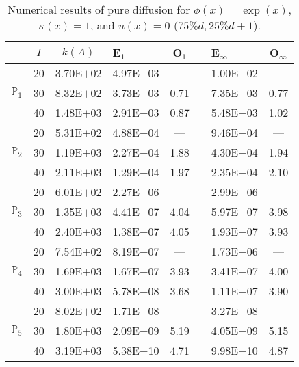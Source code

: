 \begin{table}[H]
\centering
\caption{Numerical results of pure diffusion for $\phi(x)=\exp(x)$, $\kappa(x)=1$, and $u(x)=0$ ($75\%d,25\%d+1$).}
\begin{tabular}{@{}l c c l c c l c@{}}
\toprule
 & $I$ & $k(A)$ & E$_1$ & O$_1$ && E$_{\infty}$ & O$_{\infty}$\\
\midrule
\multirow{3}{*}{$\mathbb{P}_{1}$}
 & 20 & 3.70E$+$02 & 4.97E$-$03 & --- && 1.00E$-$02 & ---\\
 & 30 & 8.32E$+$02 & 3.73E$-$03 & 0.71 && 7.35E$-$03 & 0.77\\
 & 40 & 1.48E$+$03 & 2.91E$-$03 & 0.87 && 5.48E$-$03 & 1.02\\
\midrule
\multirow{3}{*}{$\mathbb{P}_{2}$}
 & 20 & 5.31E$+$02 & 4.88E$-$04 & --- && 9.46E$-$04 & ---\\
 & 30 & 1.19E$+$03 & 2.27E$-$04 & 1.88 && 4.30E$-$04 & 1.94\\
 & 40 & 2.11E$+$03 & 1.29E$-$04 & 1.97 && 2.35E$-$04 & 2.10\\
\midrule
\multirow{3}{*}{$\mathbb{P}_{3}$}
 & 20 & 6.01E$+$02 & 2.27E$-$06 & --- && 2.99E$-$06 & ---\\
 & 30 & 1.35E$+$03 & 4.41E$-$07 & 4.04 && 5.97E$-$07 & 3.98\\
 & 40 & 2.40E$+$03 & 1.38E$-$07 & 4.05 && 1.93E$-$07 & 3.93\\
\midrule
\multirow{3}{*}{$\mathbb{P}_{4}$}
 & 20 & 7.54E$+$02 & 8.19E$-$07 & --- && 1.73E$-$06 & ---\\
 & 30 & 1.69E$+$03 & 1.67E$-$07 & 3.93 && 3.41E$-$07 & 4.00\\
 & 40 & 3.00E$+$03 & 5.78E$-$08 & 3.68 && 1.11E$-$07 & 3.90\\
\midrule
\multirow{3}{*}{$\mathbb{P}_{5}$}
 & 20 & 8.02E$+$02 & 1.71E$-$08 & --- && 3.27E$-$08 & ---\\
 & 30 & 1.80E$+$03 & 2.09E$-$09 & 5.19 && 4.05E$-$09 & 5.15\\
 & 40 & 3.19E$+$03 & 5.38E$-$10 & 4.71 && 9.98E$-$10 & 4.87\\
\bottomrule
\end{tabular}
\end{table}